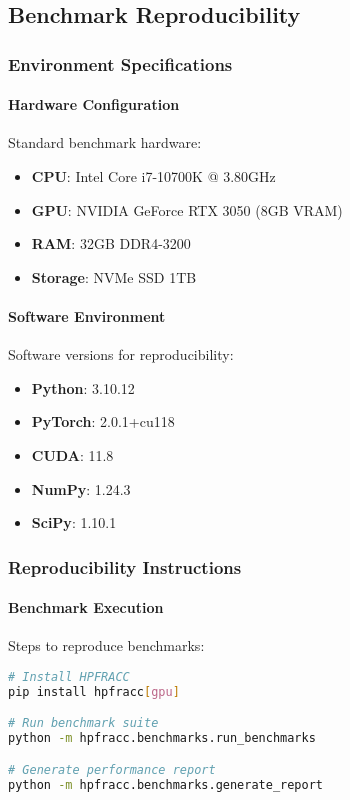 \subsection{Benchmark Reproducibility}

\subsubsection{Environment Specifications}

\paragraph{Hardware Configuration}
Standard benchmark hardware:

\begin{itemize}
    \item \textbf{CPU}: Intel Core i7-10700K @ 3.80GHz
    \item \textbf{GPU}: NVIDIA GeForce RTX 3050 (8GB VRAM)
    \item \textbf{RAM}: 32GB DDR4-3200
    \item \textbf{Storage}: NVMe SSD 1TB
\end{itemize}

\paragraph{Software Environment}
Software versions for reproducibility:

\begin{itemize}
    \item \textbf{Python}: 3.10.12
    \item \textbf{PyTorch}: 2.0.1+cu118
    \item \textbf{CUDA}: 11.8
    \item \textbf{NumPy}: 1.24.3
    \item \textbf{SciPy}: 1.10.1
\end{itemize}

\subsubsection{Reproducibility Instructions}

\paragraph{Benchmark Execution}
Steps to reproduce benchmarks:

\begin{lstlisting}[language=bash, caption=Benchmark Execution]
# Install HPFRACC
pip install hpfracc[gpu]

# Run benchmark suite
python -m hpfracc.benchmarks.run_benchmarks

# Generate performance report
python -m hpfracc.benchmarks.generate_report
\end{lstlisting}

